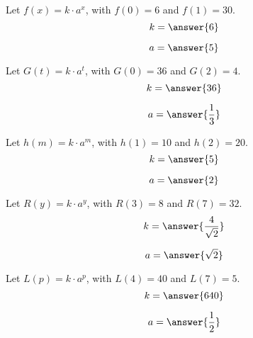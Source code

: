 \documentclass{ximera}
\author{Lee Wayand}
\begin{document}
\begin{example}


\begin{question}


Let $f(x) = k \cdot a^x$, with $f(0) = 6$ and $f(1)=30$. \\


\[
k = \answer{6}
\]

\[
a = \answer{5}
\]

\end{question}





\begin{question}


Let $G(t) = k \cdot a^t$, with $G(0) = 36$ and $G(2)=4$. \\


\[
k = \answer{36}
\]

\[
a = \answer{\frac{1}{3}}
\]

\end{question}









\begin{question}


Let $h(m) = k \cdot a^m$, with $h(1) = 10$ and $h(2)=20$. \\


\[
k = \answer{5}
\]

\[
a = \answer{2}
\]

\end{question}













\begin{question}


Let $R(y) = k \cdot a^y$, with $R(3) = 8$ and $R(7)=32$. \\


\[
k = \answer{\frac{4}{\sqrt{2}}}
\]

\[
a = \answer{\sqrt{2}}
\]

\end{question}










\begin{question}


Let $L(p) = k \cdot a^p$, with $L(4) = 40$ and $L(7)=5$. \\


\[
k = \answer{640}
\]

\[
a = \answer{\frac{1}{2}}
\]

\end{question}









\end{example}
\end{document}
